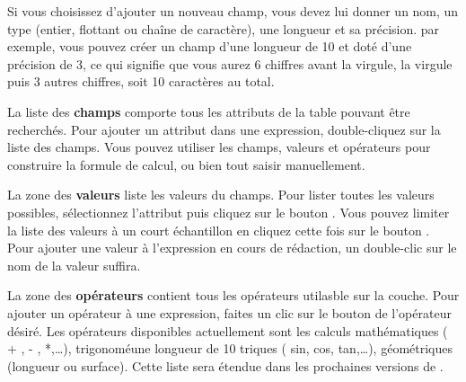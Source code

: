Si vous choisissez d'ajouter un nouveau champ, vous devez lui donner un nom, un type (entier, flottant ou chaîne de caractère), une longueur et sa précision. par exemple, vous pouvez créer un champ d'une longueur de 10 et doté d'une précision de 3, ce qui signifie que vous aurez 6 chiffres avant la virgule, la virgule puis 3 autres chiffres, soit 10 caractères au total.

La liste des \textbf{champs} comporte tous les attributs de la table pouvant être recherchés. Pour ajouter un attribut dans une expression, double-cliquez sur la liste des champs. Vous pouvez utiliser les champs, valeurs et opérateurs pour construire la formule de calcul, ou bien tout saisir manuellement.

La zone des \textbf{valeurs} liste les valeurs du champs. Pour lister toutes les valeurs possibles, sélectionnez l'attribut puis cliquez sur le bouton . Vous pouvez limiter la liste des valeurs à un court échantillon en cliquez cette fois sur le bouton . Pour ajouter une valeur à l'expression en cours de rédaction, un double-clic sur le nom de la valeur suffira.

La zone des \textbf{opérateurs} contient tous les opérateurs utilasble sur la couche. Pour ajouter un opérateur à une expression, faites un clic sur le bouton de l'opérateur désiré. Les opérateurs disponibles actuellement sont les calculs mathématiques ( + , - , *,\dots), trigonoméune longueur de 10
triques ( sin, cos, tan,\dots), géométriques (longueur ou surface). Cette liste sera étendue dans les prochaines versions de \qg.

